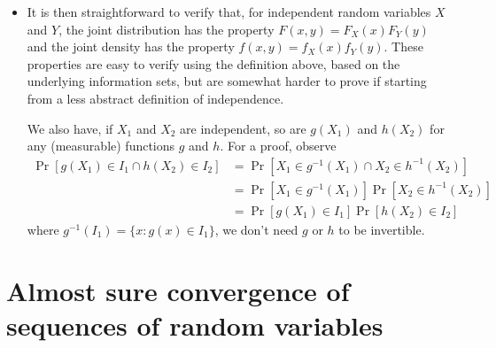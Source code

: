 \begin{itemize}[leftmargin=0pt]
\item It is then straightforward to verify that, for independent
  random variables $X$ and $Y$, the joint distribution has the
  property $F(x, y) = F_X(x) F_Y(y)$ and the joint density has the
  property $f(x,y) = f_X(x) f_Y(y)$.  These properties are easy to
  verify using the definition above, based on the underlying
  information sets, but are somewhat harder to prove if starting from
  a less abstract definition of independence.

  We also have, if $X_1$ and $X_2$ are independent, so are $g(X_1)$ and
  $h(X_2)$ for any (measurable) functions $g$ and $h$.  For a proof,
  observe
  \begin{align*}
    \Pr[g(X_1) \in I_1 \cap h(X_2) \in I_2]
    &= \Pr[X_1 \in g^{-1}(X_1) \cap X_2 \in h^{-1}(X_2)] \\
    &= \Pr[X_1 \in g^{-1}(X_1)] \Pr[X_2 \in h^{-1}(X_2)] \\
    &= \Pr[g(X_1) \in I_1] \Pr[h(X_2) \in I_2]
  \end{align*}
  where $g^{-1}(I_1) = \{x : g(x) \in I_1\}$, we don't need $g$ or $h$ to
  be invertible.

\end{itemize}

\section{Almost sure convergence of sequences of random variables}

